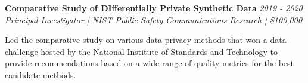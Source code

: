 

\projectspace
\textbf{Comparative Study of DIfferentially Private Synthetic Data } \hfill \textit{2019 - 2020}\\
\textit{Principal Investigator | NIST Public Safety Communications Research | \$100,000}

Led the comparative study on various data privacy methods that won a data challenge hosted by the National Institute of Standards and Technology to provide recommendations based on a wide range of quality metrics for the best candidate methods. 